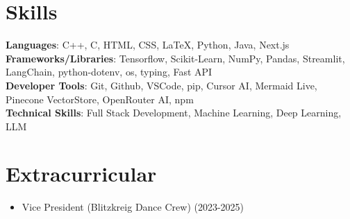 \documentclass[letterpaper,10pt]{article}
\begin{document}
\section{Skills}
 \begin{itemize}[leftmargin=0.15in, label={}]
    \small{\item{
     \textbf{Languages}{: C++, C, HTML, CSS, LaTeX, Python, Java, Next.js} \\ \vspace*{0.05cm}
     \textbf{Frameworks/Libraries}{: Tensorflow, Scikit-Learn, NumPy, Pandas, Streamlit, LangChain, python-dotenv, os, typing, Fast API} \\ \vspace*{0.05cm}
     \textbf{Developer Tools}{: Git, Github, VSCode, pip, Cursor AI, Mermaid Live, Pinecone VectorStore, OpenRouter AI, npm} \\ \vspace*{0.05cm}
     \textbf{Technical Skills}{: Full Stack Development, Machine Learning, Deep Learning, LLM}
    }}
 \end{itemize}

\vspace*{0.05cm}
\section{Extracurricular}
\begin{itemize}[leftmargin=0.15in, label={}]
  \item{Vice President (Blitzkreig Dance Crew) \hfill (2023-2025)}
\end{itemize}
\vspace*{0.05cm}
\end{document}
